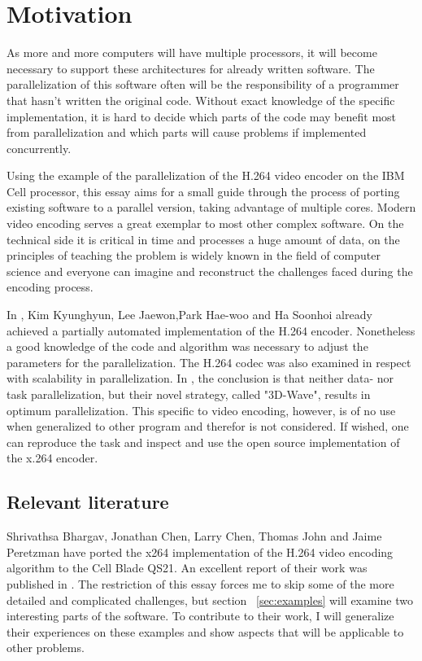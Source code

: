 \section{Motivation}
\label{sec:motivation}
As more and more computers will have multiple processors, it will become necessary to support these architectures for already written software. The parallelization of this software often will be the responsibility of a programmer that hasn't written the original code. Without exact knowledge of the specific implementation, it is hard to decide which parts of the code may benefit most from parallelization and which parts will cause problems if implemented concurrently.

Using the example of the parallelization of the H.264 video encoder on the IBM Cell processor, this essay aims for a small guide through the process of porting existing software to a parallel version, taking advantage of multiple cores. 
Modern video encoding serves a great exemplar to most other complex software. On the technical side it is critical in time and processes a huge amount of data, on the principles of teaching the  problem is widely known in the field of computer science and everyone can imagine and reconstruct the challenges faced during the encoding process. 

In \cite{Kim_automatich.264}, Kim Kyunghyun, Lee Jaewon,Park Hae-woo and Ha Soonhoi already achieved a partially automated implementation of the H.264 encoder. Nonetheless a good knowledge of the code and algorithm was necessary to adjust the parameters for the parallelization. 
The H.264 codec was also examined in respect with scalability in parallelization. In  \cite{scaleh264}, the conclusion is that neither data- nor task parallelization, but their novel strategy, called "3D-Wave", results in optimum parallelization. This specific to video encoding, however, is of no use when generalized to other program and therefor is not considered. If wished, one can reproduce the task and inspect and use the open source implementation of the x.264%
 encoder.

\subsection{Relevant literature}
\label{subsec:basis}
Shrivathsa Bhargav, Jonathan Chen, Larry Chen, Thomas John and Jaime Peretzman have ported the x264 implementation of the H.264 video encoding algorithm to the Cell Blade QS21. An excellent report of their work was published in \cite{BS08}.
The restriction of this essay forces me to skip some of the more detailed and complicated challenges, but section ~\ref{sec:examples} will examine two interesting parts of the software. To contribute to their work, I will generalize their experiences on these examples and show aspects that will be applicable to other problems.
